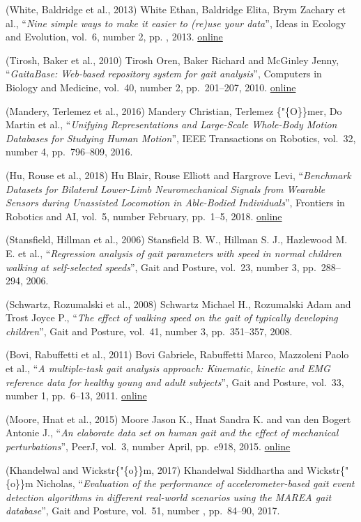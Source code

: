 \documentclass[11pt]{article}
\begin{document}
(White, Baldridge et al., 2013) White Ethan, Baldridge Elita, Brym
Zachary et al., ``\emph{Nine simple ways to make it easier to (re)use
your data}'', Ideas in Ecology and Evolution, vol.~6, number 2, pp. ,
2013.
\href{http://library.queensu.ca/ojs/index.php/IEE/article/view/4608}{online}

(Tirosh, Baker et al., 2010) Tirosh Oren, Baker Richard and McGinley
Jenny, ``\emph{GaitaBase: Web-based repository system for gait
analysis}'', Computers in Biology and Medicine, vol.~40, number 2,
pp.~201--207, 2010.
\href{http://dx.doi.org/10.1016/j.compbiomed.2009.11.016}{online}

(Mandery, Terlemez et al., 2016) Mandery Christian, Terlemez
\{"\{O\}\}mer, Do Martin et al., ``\emph{Unifying Representations and
Large-Scale Whole-Body Motion Databases for Studying Human Motion}'',
IEEE Transactions on Robotics, vol.~32, number 4, pp.~796--809, 2016.

(Hu, Rouse et al., 2018) Hu Blair, Rouse Elliott and Hargrove Levi,
``\emph{Benchmark Datasets for Bilateral Lower-Limb Neuromechanical
Signals from Wearable Sensors during Unassisted Locomotion in
Able-Bodied Individuals}'', Frontiers in Robotics and AI, vol.~5, number
February, pp.~1--5, 2018.
\href{http://journal.frontiersin.org/article/10.3389/frobt.2018.00014/full}{online}

(Stansfield, Hillman et al., 2006) Stansfield B. W., Hillman S. J.,
Hazlewood M. E. et al., ``\emph{Regression analysis of gait parameters
with speed in normal children walking at self-selected speeds}'', Gait
and Posture, vol.~23, number 3, pp.~288--294, 2006.

(Schwartz, Rozumalski et al., 2008) Schwartz Michael H., Rozumalski Adam
and Trost Joyce P., ``\emph{The effect of walking speed on the gait of
typically developing children}'', Gait and Posture, vol.~41, number 3,
pp.~351--357, 2008.

(Bovi, Rabuffetti et al., 2011) Bovi Gabriele, Rabuffetti Marco,
Mazzoleni Paolo et al., ``\emph{A multiple-task gait analysis approach:
Kinematic, kinetic and EMG reference data for healthy young and adult
subjects}'', Gait and Posture, vol.~33, number 1, pp.~6--13, 2011.
\href{http://dx.doi.org/10.1016/j.gaitpost.2010.08.009}{online}

(Moore, Hnat et al., 2015) Moore Jason K., Hnat Sandra K. and van den
Bogert Antonie J., ``\emph{An elaborate data set on human gait and the
effect of mechanical perturbations}'', PeerJ, vol.~3, number April,
pp.~e918, 2015. \href{https://peerj.com/articles/918}{online}

(Khandelwal and Wickstr\{"\{o\}\}m, 2017) Khandelwal Siddhartha and
Wickstr\{"\{o\}\}m Nicholas, ``\emph{Evaluation of the performance of
accelerometer-based gait event detection algorithms in different
real-world scenarios using the MAREA gait database}'', Gait and Posture,
vol.~51, number , pp.~84--90, 2017.


    
    



    
    
\end{document}
